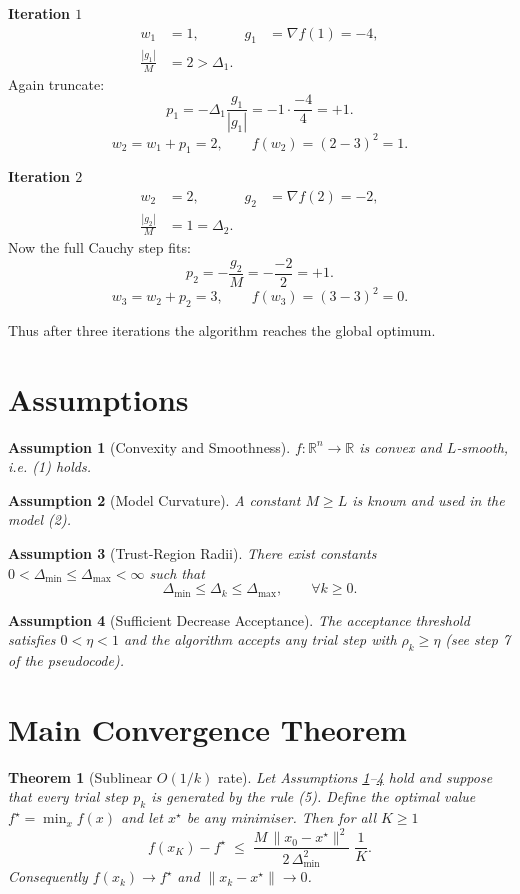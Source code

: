 \documentclass{article}
\newtheorem{theorem}{Theorem}
\newtheorem{assumption}{Assumption}
\begin{document}
\medskip
\noindent\textbf{Iteration $1$}
\[
\begin{aligned}
w_1 &=1, &
g_1 &=\nabla f(1)= -4,\\
\frac{|g_1|}{M}&=2> \Delta_1 .
\end{aligned}
\]
Again truncate:
\[
p_1=-\Delta_1\frac{g_1}{|g_1|}= -1\cdot\frac{-4}{4}=+1 .
\]
\[
w_2=w_1+p_1=2,\qquad
f(w_2)=(2-3)^2=1 .
\]

\medskip
\noindent\textbf{Iteration $2$}
\[
\begin{aligned}
w_2 &=2, &
g_2 &=\nabla f(2)= -2,\\
\frac{|g_2|}{M}&=1=\Delta_2 .
\end{aligned}
\]
Now the full Cauchy step fits:
\[
p_2=-\frac{g_2}{M}= -\frac{-2}{2}=+1 .
\]
\[
w_3=w_2+p_2=3,\qquad
f(w_3)=(3-3)^2=0 .
\]

Thus after three iterations the algorithm reaches the global optimum.

\newpage
\section*{Assumptions}
\begin{assumption}[Convexity and Smoothness]\label{ass:convex}
$f:\mathbb{R}^n\rightarrow\mathbb{R}$ is convex and $L$‑smooth,
i.e. (1) holds.
\end{assumption}
\begin{assumption}[Model Curvature]\label{ass:M}
A constant $M\ge L$ is known and used in the model (2).
\end{assumption}
\begin{assumption}[Trust‑Region Radii]\label{ass:radius}
There exist constants $0<\Delta_{\min}\le\Delta_{\max}<\infty$ such that
\[
\Delta_{\min}\le\Delta_k\le\Delta_{\max},\qquad\forall k\ge0 .
\]
\end{assumption}
\begin{assumption}[Sufficient Decrease Acceptance]\label{ass:rho}
The acceptance threshold satisfies $0<\eta<1$ and the algorithm
accepts any trial step with $\rho_k\ge\eta$ (see step 7 of the pseudocode).
\end{assumption}

\section*{Main Convergence Theorem}
\begin{theorem}[Sublinear $O(1/k)$ rate]\label{thm:rate}
Let Assumptions \ref{ass:convex}–\ref{ass:rho} hold and suppose that every
trial step $p_k$ is generated by the rule (5).  Define the optimal value
$f^\star=\min_{x}f(x)$ and let $x^\star$ be any minimiser.  Then for all
$K\ge1$
\[
f(x_K)-f^\star\;\le\;
\frac{M\,\|x_0-x^\star\|^{2}}{2\,\Delta_{\min}^{2}}\;\frac{1}{K}.
\tag{7}
\]
Consequently $f(x_k)\to f^\star$ and $\|x_k-x^\star\|\to0$.
\end{theorem}
\end{document}
